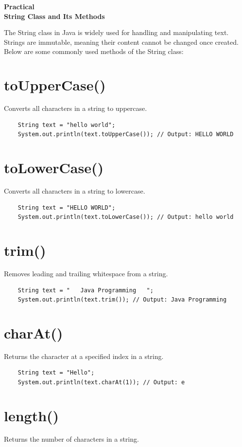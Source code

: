 \documentclass[a4paper,12pt]{article}
\newcounter{practicalno} %
\newcommand{\practicaltitle}[1]{
    \stepcounter{practicalno} %
    \newpage
    \begin{center}
        \vspace{1cm}
        \Large\textbf{Practical \thepracticalno} \\
        \vspace{0.5cm}
        \Large\textbf{#1} %
        \normalsize\vspace{1cm}
    \end{center}
}
\begin{document}
\setcounter{section}{0}
\practicaltitle{String Class and Its Methods}
The String class in Java is widely used for handling and manipulating text. Strings are immutable, meaning their content cannot be changed once created. Below are some commonly used methods of the String class:

\section{toUpperCase()}
Converts all characters in a string to uppercase.

\begin{lstlisting}
    String text = "hello world";
    System.out.println(text.toUpperCase()); // Output: HELLO WORLD
\end{lstlisting}

\section{toLowerCase()}
Converts all characters in a string to lowercase.

\begin{lstlisting}
    String text = "HELLO WORLD";
    System.out.println(text.toLowerCase()); // Output: hello world
\end{lstlisting}

\section{trim()}
Removes leading and trailing whitespace from a string.

\begin{lstlisting}
    String text = "   Java Programming   ";
    System.out.println(text.trim()); // Output: Java Programming    
\end{lstlisting}

\section{charAt()}
Returns the character at a specified index in a string.

\begin{lstlisting}
    String text = "Hello";
    System.out.println(text.charAt(1)); // Output: e     
\end{lstlisting}

\section{length()}
Returns the number of characters in a string.
\end{document}
